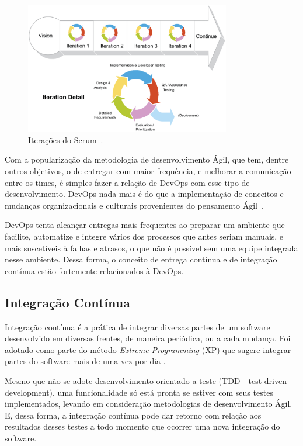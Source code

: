 \begin{figure}[H]
  \centering
  \caption{Iterações do Scrum~\cite{scrumreference:2016}.}
  \label{fig:iterative}
  \includegraphics[width=0.8\textwidth]{figuras/iterative.eps}
\end{figure}

Com a popularização da metodologia de desenvolvimento Ágil, que tem, dentre outros
objetivos, o de entregar com maior frequência, e melhorar a comunicação entre os
times, é simples fazer a relação de DevOps com esse tipo de desenvolvimento.
DevOps nada mais é do que a implementação de conceitos e mudanças organizacionais
e culturais provenientes do pensamento Ágil~\cite{scott2014}.

DevOps tenta alcançar entregas mais frequentes ao preparar um ambiente que facilite,
automatize e integre vários dos processos que antes seriam manuais, e mais
suscetíveis à falhas e atrasos, o que não é possível sem uma equipe integrada
nesse ambiente. Dessa forma, o conceito de entrega contínua e de integração
contínua estão fortemente relacionados à DevOps.~\cite{adambertram:2016}

\subsection{Integração Contínua}

Integração contínua é a prática de integrar diversas partes de um software
desenvolvido em diversas frentes, de maneira periódica, ou a cada mudança.
Foi adotado como parte do método \textit{Extreme Programming} (XP) que sugere integrar
partes do software mais de uma vez por dia \cite{fowler2006continuous}.

Mesmo que não se adote desenvolvimento orientado a teste (TDD - test driven 
development), uma funcionalidade só está pronta se estiver com seus testes 
implementados, levando em consideração metodologias de desenvolvimento Ágil. 
E, dessa forma, a integração contínua pode dar retorno com relação aos resultados
desses testes a todo momento que ocorrer uma nova integração do software. %

